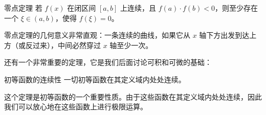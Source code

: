 \begin{theorem}{零点定理}{}
若 $f(x)$ 在闭区间 $[a,b]$ 上连续，且 $f(a) \cdot f(b) < 0$，则至少存在一个 $\xi \in (a,b)$，使得 $f(\xi) = 0$。
\end{theorem}

零点定理的几何意义非常直观：一条连续的曲线，如果它从 $x$ 轴下方出发到达上方（或反过来），中间必然穿过 $x$ 轴至少一次。

还有一个非常重要的定理，它是我们后面讨论可积和可微的基础：

\begin{theorem}{初等函数的连续性}{}
  一切初等函数在其定义域内处处连续。
\end{theorem}

这个定理是初等函数的一个重要性质。由于这些函数在其定义域内处处连续，因此我们可以放心地在这些函数上进行极限运算。